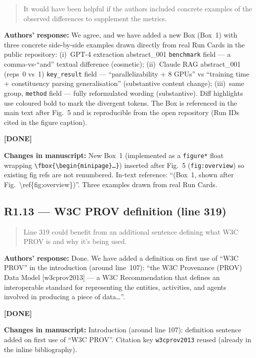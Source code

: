 \documentclass[11pt,a4paper]{article}
\newenvironment{revquote}{%
  \begin{quote}\small\itshape\color{revgray}
}{%
  \end{quote}
}
\newcommand{\response}[1]{\par\noindent\textbf{\color{revgreen}Authors' response:} #1\par}
\newcommand{\changes}[1]{\par\noindent\textbf{\color{revblue}Changes in manuscript:} #1\par}
\newcommand{\done}{\color{revgreen}\textbf{[DONE]}}
\begin{document}
\begin{revquote}
It would have been helpful if the authors included concrete examples of the observed differences to supplement the metrics.
\end{revquote}

\response{We agree, and we have added a new Box (Box~1) with three concrete side-by-side examples drawn directly from real Run Cards in the public repository: (i)~GPT-4 extraction abstract\_001 \texttt{benchmark} field --- a comma-vs-``and'' textual difference (cosmetic); (ii)~Claude RAG abstract\_001 (reps~0 vs~1) \texttt{key\_result} field --- ``parallelizability + 8 GPUs'' vs ``training time + constituency parsing generalisation'' (substantive content change); (iii)~same group, \texttt{method} field --- fully reformulated wording (substantive). Diff highlights use coloured bold to mark the divergent tokens. The Box is referenced in the main text after Fig.~5 and is reproducible from the open repository (Run IDs cited in the figure caption).} \done

\changes{New Box~1 (implemented as a \texttt{figure*} float wrapping \texttt{\textbackslash fbox\{\textbackslash begin\{minipage\}\dots\}}) inserted after Fig.~5 (\texttt{fig:overview}) so existing fig refs are not renumbered. In-text reference: ``(Box~1, shown after Fig.~\textbackslash ref\{fig:overview\})''. Three examples drawn from real Run Cards.}

\subsection*{R1.13 --- W3C PROV definition (line 319)}

\begin{revquote}
Line 319 could benefit from an additional sentence defining what W3C PROV is and why it's being used.
\end{revquote}

\response{Done. We have added a definition on first use of ``W3C PROV'' in the introduction (around line~107): ``the W3C Provenance (PROV) Data Model [w3cprov2013] --- a W3C Recommendation that defines an interoperable standard for representing the entities, activities, and agents involved in producing a piece of data\ldots''.} \done

\changes{Introduction (around line 107): definition sentence added on first use of ``W3C PROV''. Citation key \texttt{w3cprov2013} reused (already in the inline bibliography).}
\end{document}

